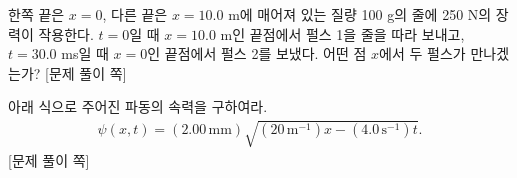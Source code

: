 \documentclass[floatfix,nofootinbib,superscriptaddress,fleqn,preprint]{revtex4-2}
\begin{document}
\newpage

한쪽 끝은 $x=0$, 다른 끝은 $x=10.0$ m에 매어져 있는 질량 100 g의 줄에
250 N의 장력이 작용한다. $t=0$일 때 $x=10.0$ m인 끝점에서 펄스 1을
줄을 따라 보내고, $t=30.0$ ms일 때 $x=0$인 끝점에서 펄스 2를
보냈다. 어떤 점 $x$에서 두 펄스가 만나겠는가? 
\newpage
{\color{gray} [문제 풀이 쪽]}

\newpage

아래 식으로 주어진 파동의 속력을 구하여라.
\begin{align}
  \label{eq:4}
\psi(x,t) = (2.00\,\mathrm{mm}) \sqrt{(20\,\mathrm{m}^{-1}) x - (4.0
  \,\mathrm{s}^{-1})t} .
\end{align}
\newpage
{\color{gray} [문제 풀이 쪽]}

\newpage
\end{document}

